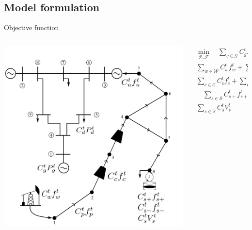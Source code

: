 \documentclass[hyperref={colorlinks,citecolor=blue,linkcolor=blue,urlcolor=blue}]{beamer}
\begin{document}
\subsection{Model formulation}
\begin{frame}{Objective function}
\begin{columns}
\begin{column}{0.5\textwidth}
   \begin{center}
     \includegraphics[width=1.1\textwidth]{figures/network_math_alternative.pdf}
     \end{center}
\end{column}
\begin{column}{0.5\textwidth}  %
\begin{equation} \label{eq:obj_func_integrated}
\begin{split}
\min_{\mathcal{P}, \mathcal{F}} \quad  \sum_{g \in \mathcal{G}} C_{g}^t {P_{g}^t} + \sum_{d \in \mathcal{D}} C_{d}^t {P_{d}^t} +  \\ \sum_{w \in \mathcal{W}} C_{w}^t {f_{w}^t} +  \sum_{p \in \mathcal{P}} C_{p}^t {f_{p}^t}  + \\ \sum_{c \in \mathcal{C}} C_{c}^t {f_{c}^t} + \sum_{u \in \mathcal{U}} C_{u}^{t} {f_{u}^{t}} + \\ \quad \sum_{s \in \mathcal{S}} C_{s+}^{t} {f_{s+}^{t}}  + \sum_{s \in \mathcal{S}} C_{s-}^{t} {f_{s-}^{t}} + \\ \sum_{s \in \mathcal{S}} C_{s}^{t} {V_{s}^{t}}
\end{split}
\end{equation}
    
\end{column}
\end{columns}
\end{frame}
\end{document}
